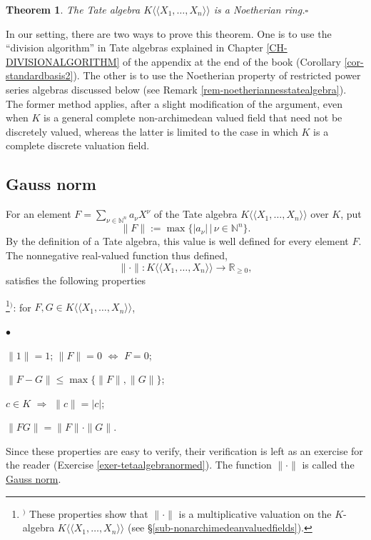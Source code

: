 \documentclass[a4paper,12pt, dvipdfmx]{jsbook}
\def\N{\mathbb{N}}
\def\R{\mathbb{R}}
\def\dl{\langle\!\langle}
\def\dr{\rangle\!\rangle}
\newcommand{\abs}[1]{\lvert#1\rvert}
\newcommand{\abss}[1]{\|#1\|}
\renewenvironment{itemize}%
{%
   \begin{list}{\parbox{1zw}{$\bullet$}}%
   {%
      \setlength{\topsep}{.5zh}
      \setlength{\itemindent}{0zw}
      \setlength{\leftmargin}{3zw}%
      \setlength{\rightmargin}{0zw}%
      \setlength{\labelsep}{.5zw}%
      \setlength{\labelwidth}{3zw}%
      \setlength{\itemsep}{0.2em}%
      \setlength{\parsep}{0em}%
      \setlength{\listparindent}{0zw}%
   }
}{%
   \end{list}%
}
\theoremstyle{plain}
\newtheorem{thm}{\bfseries Theorem}[section]
\theoremstyle{definition}
\newcounter{chushaku}
\def\chu#1{\addtocounter{chushaku}{1}\footnote[\value{chushaku}]{${}^)$ #1}${}^)$}
\begin{document}
\begin{thm}\label{thm-tatealgebranoether}{\rm 
The Tate algebra $K\dl X_1,\ldots,X_n\dr$ is a Noetherian ring.}\hfill$\square$
\end{thm}

In our setting, there are two ways to prove this theorem.
One is to use the ``division algorithm'' in Tate algebras explained in Chapter \ref{CH-DIVISIONALGORITHM} of the appendix at the end of the book (Corollary \ref{cor-standardbasis2}).
The other is to use the Noetherian property of restricted power series algebras discussed below (see Remark \ref{rem-noetheriannesstatealgebra}).
The former method applies, after a slight modification of the argument, even when $K$ is a general complete non-archimedean valued field that need not be discretely valued, whereas the latter is limited to the case in which $K$ is a complete discrete valuation field.

\subsection{Gauss norm}\label{sub-gaussnorm}
For an element $F=\sum_{\nu\in\N^n}a_{\nu}X^{\nu}$ of the Tate algebra $K\dl X_1,\ldots,X_n\dr$ over $K$, put
$$
\abss{F}:=\max\{\abs{a_{\nu}}\,|\,\nu\in\N^n\}.
$$
By the definition of a Tate algebra, this value is well defined for every element $F$.
The nonnegative real-valued function thus defined,
$$
\abss{\cdot}\colon K\dl X_1,\ldots,X_n\dr\longrightarrow\R_{\geq 0},
$$
satisfies the following properties\chu{These properties show that $\abss{\cdot}$ is a multiplicative valuation on the $K$-algebra $K\dl X_1,\ldots,X_n\dr$ (see \S\ref{sub-nonarchimedeanvaluedfields}).}: for $F,G\in K\dl X_1,\ldots,X_n\dr$,
\begin{itemize}
\item[(a)] $\abss{1}=1$; $\abss{F}=0$ $\Leftrightarrow$ $F=0$;
\item[(b)] $\abss{F-G}\leq\max\{\abss{F},\abss{G}\}$;
\item[(c)] $c\in K$ $\Rightarrow$ $\abss{c}=\abs{c}$;
\item[(d)] $\abss{FG}=\abss{F}\cdot\abss{G}$.
\end{itemize}
Since these properties are easy to verify, their verification is left as an exercise for the reader (Exercise \ref{exer-tetaalgebranormed}).
The function $\abss{\cdot}$ is called the \underline{Gauss norm}.
\end{document}
